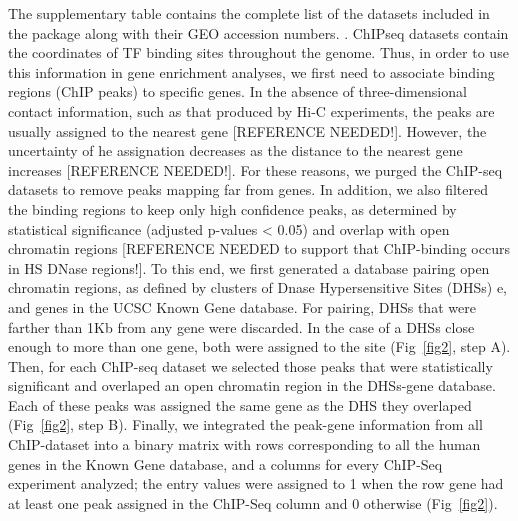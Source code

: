 \documentclass[10pt,letterpaper]{article}
\begin{document}
 The supplementary table  contains the complete list of the datasets included in the package along with their GEO accession numbers. .  
 ChIPseq datasets contain the coordinates of TF binding sites throughout the genome. Thus, in order to use this information in gene enrichment analyses, we first need to associate binding regions (ChIP peaks) to specific genes. In the absence of three-dimensional contact information, such as that produced by Hi-C experiments, the peaks are usually assigned to the nearest gene [REFERENCE NEEDED!]. However, the uncertainty of he assignation decreases as the distance to the nearest gene increases [REFERENCE NEEDED!]. For these reasons, we purged the ChIP-seq datasets to remove peaks mapping far from genes. In addition, we also filtered the binding regions to keep only high confidence peaks, as determined by statistical significance (adjusted p-values < 0.05) and overlap with open chromatin regions  [REFERENCE NEEDED to support that ChIP-binding occurs in HS DNase regions!]. To this end, we first generated a database pairing open chromatin regions, as defined by clusters of Dnase Hypersensitive Sites (DHSs) e\cite{EncodeDHS1}\cite{EncodeDHS2}, and genes in the UCSC Known Gene database\cite{KnownGene}. For pairing, DHSs that were farther than 1Kb from any gene were discarded. In the case of a DHSs close enough to more than one gene, both were assigned to the site (Fig~\ref{fig2}, step A). Then, for each ChIP-seq dataset we selected those peaks that were statistically significant and overlaped an open chromatin region in the DHSs-gene database. Each of these peaks was assigned the same gene as the DHS they overlaped (Fig~\ref{fig2}, step B). Finally, we integrated the peak-gene information from all ChIP-dataset into a binary matrix with rows corresponding to all the human genes in the Known Gene database, and a columns for every ChIP-Seq experiment analyzed; the entry values were assigned to 1 when the row gene had at least one peak assigned in the ChIP-Seq column and 0 otherwise (Fig~\ref{fig2}).
 	
\end{document}
